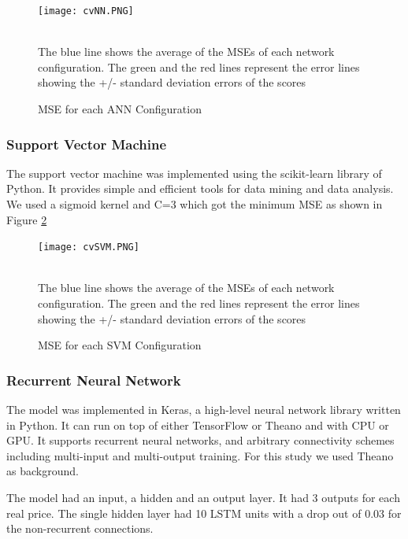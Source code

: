 \begin{figure}[h]
\centering
\texttt{[image: cvNN.PNG]}
\caption{MSE for each ANN Configuration}
\begin{minipage}{12cm}
    \footnotesize
    \emph \\ The blue line shows the average of the MSEs of each network configuration. The green and the red lines represent the error lines showing the +/- standard deviation errors of the scores
    \end{minipage}
\label{fig:cvNN}
\end{figure}

\subsubsection{Support Vector Machine}
The support vector machine was implemented using the scikit-learn library of Python. It provides simple and efficient tools for data mining and data analysis. We used a sigmoid kernel and C=3 which got the minimum MSE as shown in Figure \ref{fig:cvSVM}

\begin{figure}[h]
\centering
\texttt{[image: cvSVM.PNG]}
\caption{MSE for each SVM Configuration}
\begin{minipage}{12cm}
    \footnotesize
    \emph \\ The blue line shows the average of the MSEs of each network configuration. The green and the red lines represent the error lines showing the +/- standard deviation errors of the scores
    \end{minipage}

\label{fig:cvSVM}
\end{figure}

\subsubsection{Recurrent Neural Network}

The model was implemented in Keras, a high-level neural network library written in Python. It can run on top of either TensorFlow or Theano and with CPU or GPU. It supports recurrent neural networks, and arbitrary connectivity schemes including multi-input and multi-output training. For this study we used Theano as background.

The model had an input, a hidden and an output layer. It had 3 outputs for each real price. The single hidden layer had 10 LSTM units with a drop out of 0.03 for the non-recurrent connections. 

